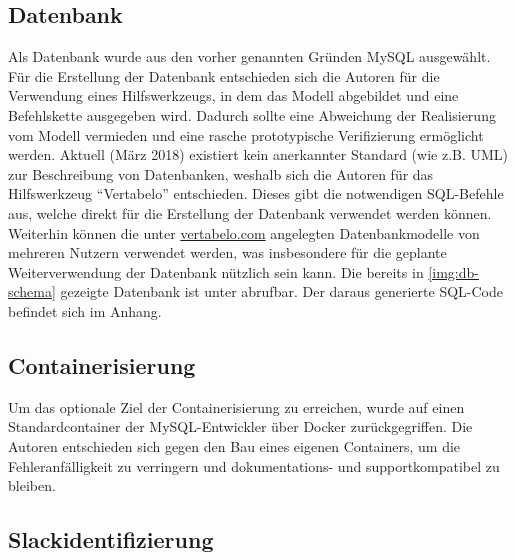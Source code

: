 \subsection{Datenbank}

Als Datenbank wurde aus den vorher genannten Gründen MySQL ausgewählt.
Für die Erstellung der Datenbank entschieden sich die Autoren für die Verwendung eines Hilfswerkzeugs, in dem das Modell abgebildet und eine Befehlskette ausgegeben wird. Dadurch sollte eine Abweichung der Realisierung vom Modell vermieden und eine rasche prototypische Verifizierung ermöglicht werden. Aktuell (März 2018) existiert kein anerkannter Standard (wie z.B. UML) zur Beschreibung von Datenbanken, weshalb sich die Autoren für das Hilfswerkzeug \enquote{Vertabelo} entschieden. Dieses gibt die notwendigen SQL-Befehle aus, welche direkt für die Erstellung der Datenbank verwendet werden können. Weiterhin können die unter \url{vertabelo.com} angelegten Datenbankmodelle von mehreren Nutzern verwendet werden, was insbesondere für die geplante Weiterverwendung der Datenbank nützlich sein kann.
Die bereits in \autoref{img:db-schema} gezeigte Datenbank ist unter \cite{VertabeloDesignYourDatabase2018} abrufbar. Der daraus generierte SQL-Code befindet sich im Anhang.


\subsection{Containerisierung}

Um das optionale Ziel der Containerisierung zu erreichen, wurde auf einen Standardcontainer der MySQL-Entwickler über Docker zurückgegriffen. Die Autoren entschieden sich gegen den Bau eines eigenen Containers, um die Fehleranfälligkeit zu verringern und dokumentations- und supportkompatibel zu bleiben.







\subsection{Slackidentifizierung}


